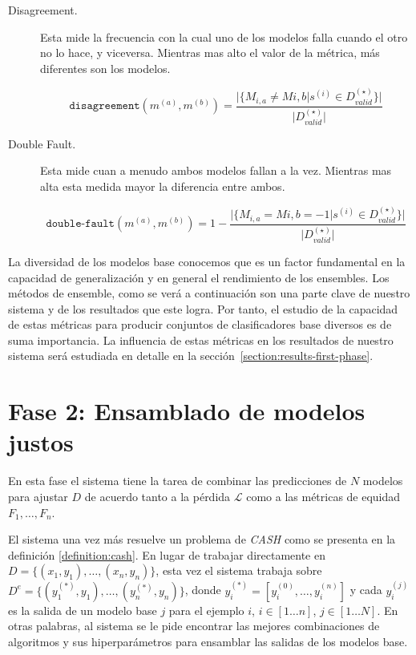 \begin{description}

    \item[Disagreement.]
    Esta mide la frecuencia con la cual uno de los modelos falla cuando el otro no lo hace, y viceversa.
    Mientras mas alto el valor de la métrica, más diferentes son los modelos.

    \begin{equation}
        \texttt{disagreement}(m^{(a)}, m^{(b)}) = \frac{\vert\{M_{i,a} \neq M{i,b} \vert s^{(i)} \in D^{(\star)}_{valid}\}\vert}{\vert D^{(\star)}_{valid} \vert}
    \end{equation}

    \item[Double Fault.]
    Esta mide cuan a menudo ambos modelos fallan a la vez.
    Mientras mas alta esta medida mayor la diferencia entre ambos.

    \begin{equation}
        \texttt{double-fault}(m^{(a)}, m^{(b)}) = 1 - \frac{\vert\{M_{i,a} = M{i,b} = -1 \vert s^{(i)} \in D^{(\star)}_{valid}\}\vert}{\vert D^{(\star)}_{valid} \vert}
    \end{equation}
    
\end{description}

La diversidad de los modelos base conocemos que es un factor fundamental en la capacidad de generalización y en general el rendimiento de los ensembles.
Los métodos de ensemble, como se verá a continuación son una parte clave de nuestro sistema y de los resultados que este logra.
Por tanto, el estudio de la capacidad de estas métricas para producir conjuntos de clasificadores base diversos es de suma importancia.
La influencia de estas métricas en los resultados de nuestro sistema será estudiada en detalle en la sección~\ref{section:results-first-phase}.

\section{Fase 2: Ensamblado de modelos justos}\label{section:second-phase}

En esta fase el sistema tiene la tarea de combinar las predicciones de $N$ modelos para ajustar $D$ de acuerdo tanto a la pérdida $\mathcal{L}$ como a las métricas de equidad $F_1, \dots, F_n$.

El sistema una vez más resuelve un problema de \emph{CASH} como se presenta en la definición \ref{definition:cash}.
En lugar de trabajar directamente en $D = \{(x_1,y_1),\dots, (x_n,y_n)\}$, esta vez el sistema trabaja sobre $D^e = \{(y_1^{(*)}, y_1),\dots,(y_n^{(*)}, y_n)\}$, donde $y_i^{(*)} = [y_i^{(0)},\dots,y_i^{(n)}]$ y cada $y_i^{(j)}$ es la salida de un modelo base $j$ para el ejemplo $i$, $i\in[1 \dots n]$, $j\in[1 \dots N]$.
En otras palabras, al sistema se le pide encontrar las mejores combinaciones de algoritmos y sus hiperparámetros para ensamblar las salidas de los modelos base.

